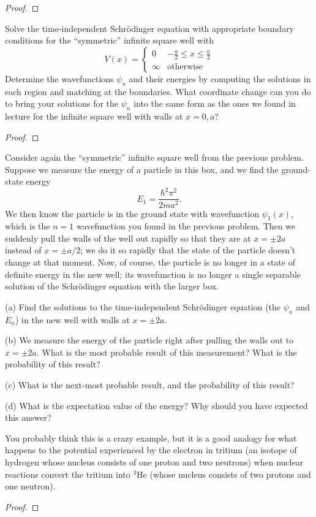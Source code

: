 \documentclass{article}
\begin{document}
\begin{proof}
\end{proof}

\newpage

\begin{ques}\label{q6}
Solve the time-independent Schrödinger equation with appropriate boundary conditions
for the “symmetric” infinite square well with
\[
V(x) =
\begin{cases}
0 & -\frac{a}{2} \le x \le \frac{a}{2} \\
\infty & \text{otherwise}
\end{cases}
\]
Determine the wavefunctions $\psi_n$ and their energies by computing the solutions in each
region and matching at the boundaries. What coordinate change can you do to bring your
solutions for the $\psi_n$ into the same form as the ones we found in lecture for the infinite
square well with walls at $x = 0, a$?
\end{ques}

\begin{proof}
\end{proof}

\newpage

\begin{ques}\label{q7}
Consider again the “symmetric” infinite square well from the previous problem. Suppose
we measure the energy of a particle in this box, and we find the ground-state energy
\[
E_1 = \frac{\hbar^2\pi^2}{2ma^2}.
\]
We then know the particle is in the ground state with wavefunction $\psi_1(x)$,
which is the $n = 1$ wavefunction you found in the previous problem. Then we suddenly
pull the walls of the well out rapidly so that they are at $x = \pm 2a$ instead of $x = \pm a/2$; we do
it so rapidly that the state of the particle doesn’t change at that moment. Now, of course,
the particle is no longer in a state of definite energy in the new well; its wavefunction is no
longer a single separable solution of the Schrödinger equation with the larger box.

(a) Find the solutions to the time-independent Schrödinger equation (the $\psi_n$ and $E_n$) in
the new well with walls at $x = \pm 2a$.

(b) We measure the energy of the particle right after pulling the walls out to $x = \pm 2a$.
What is the most probable result of this measurement? What is the probability of
this result?

(c) What is the next-most probable result, and the probability of this result?

(d) What is the expectation value of the energy? Why should you have expected this
answer?

You probably think this is a crazy example, but it is a good analogy for what happens to
the potential experienced by the electron in tritium (an isotope of hydrogen whose nucleus
consists of one proton and two neutrons) when nuclear reactions convert the tritium into
${}^3$He (whose nucleus consists of two protons and one neutron).
\end{ques}

\begin{proof}
\end{proof}

\newpage
\end{document}
